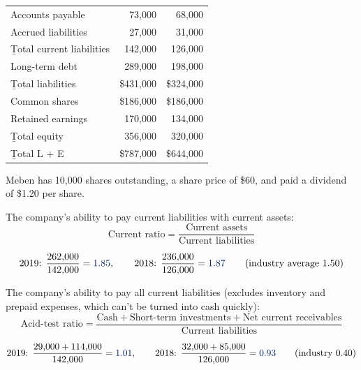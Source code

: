 \begin{example}
\begin{center}
\begin{minipage}[t]{0.53\linewidth}
\begin{tabular}[t]{lrr}
            Accounts payable & 73,000 & 68,000 \\
            Accrued liabilities & 27,000 & 31,000 \\
            \b{Total current liabilities} & 142,000 & 126,000 \\
            Long-term debt & 289,000 & 198,000 \\
            \b{Total liabilities} & \$431,000 & \$324,000 \\
            \midrule
            Common shares & \$186,000 & \$186,000 \\
            Retained earnings & 170,000 & 134,000 \\
            \b{Total equity} & 356,000 & 320,000 \\
            \b{Total L + E} & \$787,000 & \$644,000 \\
            \bottomrule
        \end{tabular}
    \end{minipage}
    \end{center}
    Meben has 10,000 shares outstanding, a share price of \$60, and paid a
    dividend of \$1.20 per share.
\end{example}

\begin{definition}
    The company's ability to pay current liabilities with current assets:
    \[\boxed{\text{Current ratio} = \frac{\text{Current assets}}{\text{Current liabilities}}}\]
\end{definition}
\[\text{2019: } \frac{262{,}000}{142{,}000} = \db{1.85}, \qquad \text{2018: } \frac{236{,}000}{126{,}000} = \db{1.87} \qquad (\text{industry average } 1.50)\]

\begin{definition}
    The company's ability to pay all current liabilities  (excludes inventory and prepaid expenses, which can't
    be turned into cash quickly):
    \[\boxed{\text{Acid-test ratio} = \frac{\text{Cash} + \text{Short-term investments} + \text{Net current receivables}}{\text{Current liabilities}}}\]
\end{definition}
\[\text{2019: } \frac{29{,}000 + 114{,}000}{142{,}000} = \db{1.01}, \qquad \text{2018: } \frac{32{,}000 + 85{,}000}{126{,}000} = \db{0.93} \qquad (\text{industry } 0.40)\]

